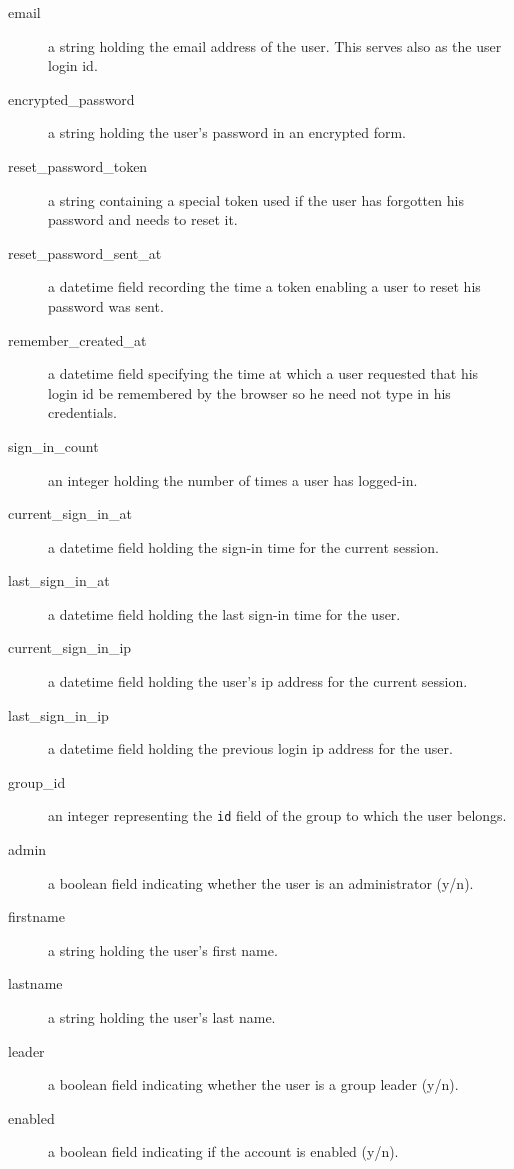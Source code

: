 \documentclass[12pt]{article}
\begin{document}
\begin{description}
\item[email]
a string holding the email address of the user. This serves also as the
user login id.
\item[encrypted\_password]
a string holding the user's password in an encrypted form.
\item[reset\_password\_token]
a string containing a special token used if the user has forgotten his
password and needs to reset it.
\item[reset\_password\_sent\_at]
a datetime field recording the time a token enabling a user to reset his
password was sent.
\item[remember\_created\_at]
a datetime field specifying the time at which a user requested that his
login id be remembered by the browser so he need not type in his credentials.
\item[sign\_in\_count]
an integer holding the number of times a user has logged-in.
\item[current\_sign\_in\_at]
a datetime field holding the sign-in time for the current session.
\item[last\_sign\_in\_at]
a datetime field holding the last sign-in time for the user.
\item[current\_sign\_in\_ip]
a datetime field holding the user's ip address for the current session.
\item[last\_sign\_in\_ip]
a datetime field holding the previous login ip address for the user.
\item[group\_id]
an integer representing the \verb=id= field of the group to which
the user belongs.
\item[admin]
a boolean field indicating whether the user is an administrator (y/n).
\item[firstname]
a string holding the user's first name.
\item[lastname]
a string holding the user's last name.
\item[leader]
a boolean field indicating whether the user is a group leader (y/n).
\item[enabled]
a boolean field indicating if the account is enabled (y/n).

\end{description}
\end{document}

